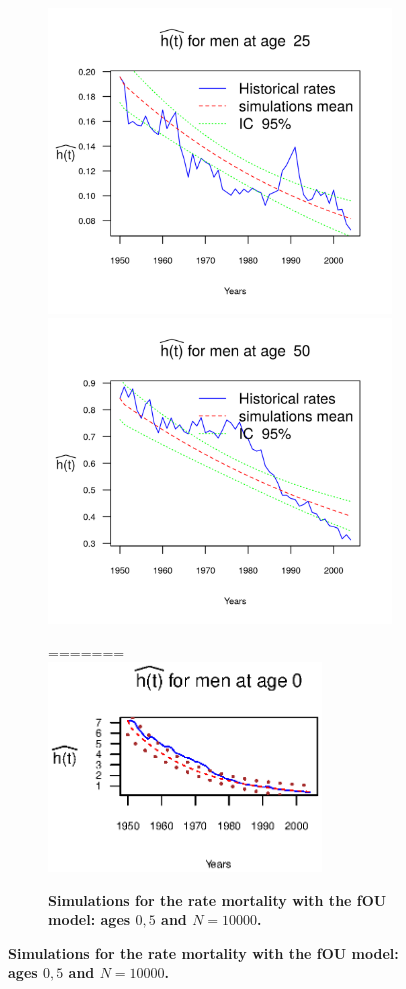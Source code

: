 \documentclass[smallextended]{svjour3}
\begin{document}
\begin{figure}[H]
\begin{figure}[H]
    \includegraphics{PlotMen25.png}
    \includegraphics{PlotMen50.png}
    \caption{\bf Simulations for the rate mortality with the fOU model: ages
    $0,5$ and $N=10000$.}
=======
    \includegraphics[width = 2.85in]{PlotMen0.eps}

\end{figure}
\end{figure}
\end{document}
